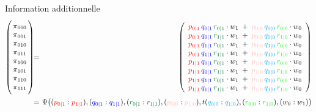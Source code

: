 \begin{frame}{\vskip -0.2cm \LARGE Information additionnelle}
\vskip -0.5cm
\begin{eqnarray*}
\left(\!\!\begin{array}{c}
\overset{{\color{white}+}}{\pi}_{000} \\
\overset{{\color{white}.}}{\pi}_{001} \\
\overset{{\color{white}.}}{\pi}_{010} \\
\overset{{\color{white}.}}{\pi}_{011} \\
\overset{{\color{white}.}}{\pi}_{100} \\
\overset{{\color{white}.}}{\pi}_{101} \\
\overset{{\color{white}.}}{\pi}_{110} \\
\underset{{\color{white}.}}{\overset{{\color{white}.}}{\pi}_{111}} \\
\end{array}\!\!\right)
& \!\! = \!\! &
\left(\begin{array}{c}
\pzo\,\qzo\,\rzo \cdot w_{1} \;+\; \pzz\,\qzz\,\rzz \cdot w_{0} \\
\pzo\,\qzo\,\roo \cdot w_{1} \;+\; \pzz\,\qzz\,\roz \cdot w_{0} \\
\pzo\,\qoo\,\rzo \cdot w_{1} \;+\; \pzz\,\qoz\,\rzz \cdot w_{0} \\
\pzo\,\qoo\,\roo \cdot w_{1} \;+\; \pzz\,\qoz\,\roz \cdot w_{0} \\
\poo\,\qzo\,\rzo \cdot w_{1} \;+\; \poz\,\qzz\,\rzz \cdot w_{0} \\
\poo\,\qzo\,\roo \cdot w_{1} \;+\; \poz\,\qzz\,\roz \cdot w_{0} \\
\poo\,\qoo\,\rzo \cdot w_{1} \;+\; \poz\,\qoz\,\rzz \cdot w_{0} \\
\poo\,\qoo\,\roo \cdot w_{1} \;+\; \poz\,\qoz\,\roz \cdot w_{0} \\
\end{array}\right)
\\
& \!\! =\!\! &
	\!\!\Psi\!\left(
		(\pzo:\poo),
		(\qzo:\qoo),
		(\rzo:\roo),
		(\pzz:\poz),
		t(\qzz:\qoz),
		(\rzz:\roz),
		\left(w_{0}:w_{1}\right)
	\right)
\end{eqnarray*}

\vskip -0.1cm



\end{frame}
